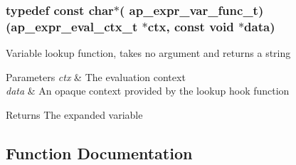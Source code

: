 \subsubsection[{\texorpdfstring{ap\+\_\+expr\+\_\+var\+\_\+func\+\_\+t}{ap_expr_var_func_t}}]{\setlength{\rightskip}{0pt plus 5cm}typedef const char$\ast$( ap\+\_\+expr\+\_\+var\+\_\+func\+\_\+t) ({\bf ap\+\_\+expr\+\_\+eval\+\_\+ctx\+\_\+t} $\ast${\bf ctx}, const {\bf void} $\ast${\bf data})}\hypertarget{group__AP__EXPR_ga7f4e46bc4e3f27e1ca50e59e45b6cc77}{}\label{group__AP__EXPR_ga7f4e46bc4e3f27e1ca50e59e45b6cc77}
Variable lookup function, takes no argument and returns a string 
\begin{DoxyParams}{Parameters}
{\em ctx} & The evaluation context \\
\hline
{\em data} & An opaque context provided by the lookup hook function \\
\hline
\end{DoxyParams}
\begin{DoxyReturn}{Returns}
The expanded variable 
\end{DoxyReturn}


\subsection{Function Documentation}
